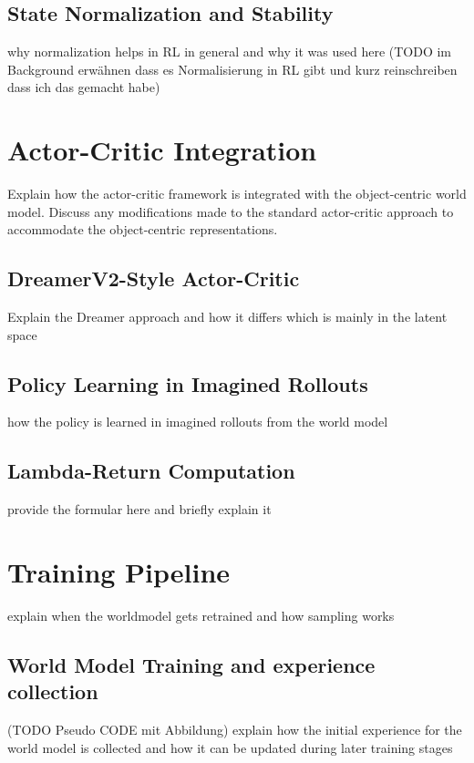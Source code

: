 \documentclass[
	english,
	ruledheaders=section,
	class=report,
	thesis={type=master},
	accentcolor=9c,
	custommargins=true,
	marginpar=false,
	parskip=half-,
	fontsize=11pt,
]{tudapub}
\begin{document}
\subsection{State Normalization and Stability}
\label{subsec:normalization}
why normalization helps in RL in general and why it was used here
(TODO im Background erwähnen dass es Normalisierung in RL gibt und kurz reinschreiben dass ich das gemacht habe)

\section{Actor-Critic Integration}
\label{sec:actor_critic}
Explain how the actor-critic framework is integrated with the object-centric world model.
Discuss any modifications made to the standard actor-critic approach to accommodate the
object-centric representations.

\subsection{DreamerV2-Style Actor-Critic}
\label{subsec:dreamer_ac}
Explain the Dreamer approach and how it differs which is mainly in the latent space

\subsection{Policy Learning in Imagined Rollouts}
\label{subsec:imagined_rollouts}
how the policy is learned in imagined rollouts from the world model

\subsection{Lambda-Return Computation}
\label{subsec:lambda_returns}
provide the formular here and briefly explain it

\section{Training Pipeline}
\label{sec:training_pipeline}
explain when the worldmodel gets retrained and how sampling works

\subsection{World Model Training and experience collection}
\label{subsec:world_model_training}
(TODO Pseudo CODE mit Abbildung)
explain how the initial experience for the world model is collected and how it can be updated during later training stages
\end{document}
